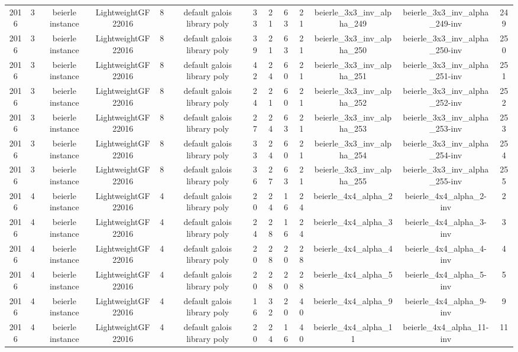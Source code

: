 \begin{tabular}{c c c c c c c c c c c c c}
2016 & 3 & beierle instance & LightweightGF22016 & 8 & default galois library poly & 33 & 21 & 63 & 21 & beierle_3x3_inv_alpha_249 & beierle_3x3_inv_alpha_249-inv & 249 \\
2016 & 3 & beierle instance & LightweightGF22016 & 8 & default galois library poly & 39 & 21 & 63 & 21 & beierle_3x3_inv_alpha_250 & beierle_3x3_inv_alpha_250-inv & 250 \\
2016 & 3 & beierle instance & LightweightGF22016 & 8 & default galois library poly & 42 & 24 & 60 & 21 & beierle_3x3_inv_alpha_251 & beierle_3x3_inv_alpha_251-inv & 251 \\
2016 & 3 & beierle instance & LightweightGF22016 & 8 & default galois library poly & 24 & 21 & 60 & 21 & beierle_3x3_inv_alpha_252 & beierle_3x3_inv_alpha_252-inv & 252 \\
2016 & 3 & beierle instance & LightweightGF22016 & 8 & default galois library poly & 27 & 24 & 63 & 21 & beierle_3x3_inv_alpha_253 & beierle_3x3_inv_alpha_253-inv & 253 \\
2016 & 3 & beierle instance & LightweightGF22016 & 8 & default galois library poly & 33 & 24 & 60 & 21 & beierle_3x3_inv_alpha_254 & beierle_3x3_inv_alpha_254-inv & 254 \\
2016 & 3 & beierle instance & LightweightGF22016 & 8 & default galois library poly & 36 & 27 & 63 & 21 & beierle_3x3_inv_alpha_255 & beierle_3x3_inv_alpha_255-inv & 255 \\
2016 & 4 & beierle instance & LightweightGF22016 & 4 & default galois library poly & 20 & 24 & 16 & 24 & beierle_4x4_alpha_2 & beierle_4x4_alpha_2-inv & 2 \\
2016 & 4 & beierle instance & LightweightGF22016 & 4 & default galois library poly & 24 & 28 & 16 & 24 & beierle_4x4_alpha_3 & beierle_4x4_alpha_3-inv & 3 \\
2016 & 4 & beierle instance & LightweightGF22016 & 4 & default galois library poly & 20 & 28 & 20 & 28 & beierle_4x4_alpha_4 & beierle_4x4_alpha_4-inv & 4 \\
2016 & 4 & beierle instance & LightweightGF22016 & 4 & default galois library poly & 20 & 28 & 20 & 28 & beierle_4x4_alpha_5 & beierle_4x4_alpha_5-inv & 5 \\
2016 & 4 & beierle instance & LightweightGF22016 & 4 & default galois library poly & 16 & 32 & 20 & 40 & beierle_4x4_alpha_9 & beierle_4x4_alpha_9-inv & 9 \\
2016 & 4 & beierle instance & LightweightGF22016 & 4 & default galois library poly & 20 & 24 & 16 & 40 & beierle_4x4_alpha_11 & beierle_4x4_alpha_11-inv & 11 \\

\end{tabular}
